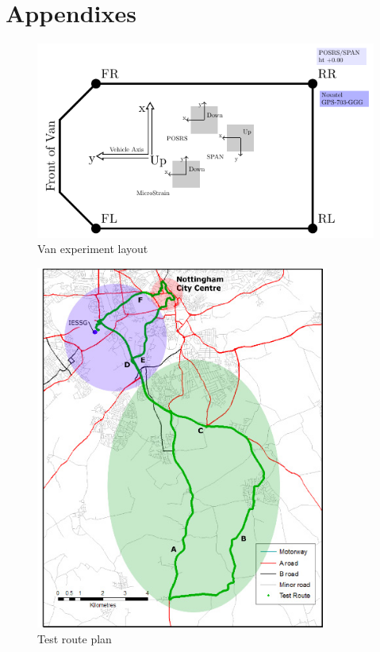 \documentclass[british,DIV=calc, paper=a4, fontsize=12pt, onecolumn]{scrartcl}
\begin{document}

\chapter{Appendixes}
\begin{figure}[tbh]
\centering\includegraphics[clip,width=12cm]{pic/VanLayout}%
\caption{Van experiment layout\label{fig:Van-experiment-layout}}
\end{figure}
\begin{figure}[tbh]
\centering\includegraphics[clip,height=12cm]{pic/TrajectoryLayout}%
\caption{Test route plan\label{fig:Van-trajectory}}
\end{figure}
\end{document}
